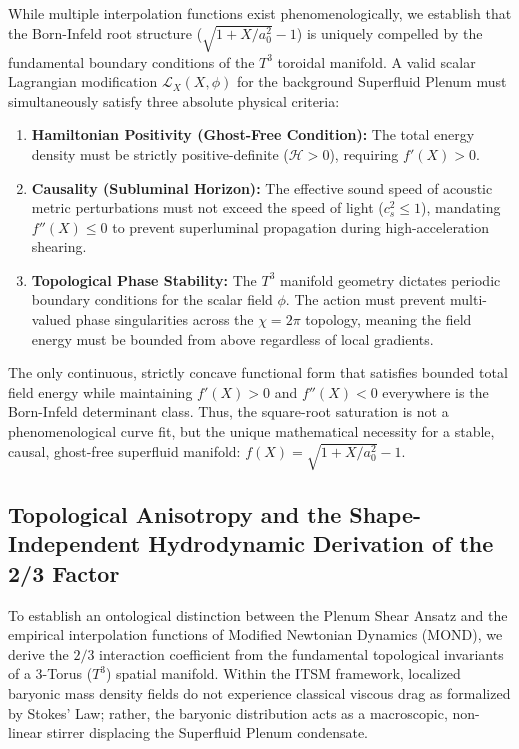 \documentclass[aps,prd,10pt,twocolumn,superscriptaddress,nofootinbib]{revtex4-2}
\begin{document}
While multiple interpolation functions exist phenomenologically, we establish that the Born-Infeld root structure ($\sqrt{1+X/a_0^2}-1$) is uniquely compelled by the fundamental boundary conditions of the $T^3$ toroidal manifold. A valid scalar Lagrangian modification $\mathcal{L}_X(X, \phi)$ for the background Superfluid Plenum must simultaneously satisfy three absolute physical criteria:
\begin{enumerate}
    \item \textbf{Hamiltonian Positivity (Ghost-Free Condition):} The total energy density must be strictly positive-definite ($\mathcal{H} > 0$), requiring $f'(X) > 0$.
    \item \textbf{Causality (Subluminal Horizon):} The effective sound speed of acoustic metric perturbations must not exceed the speed of light ($c_s^2 \le 1$), mandating $f''(X) \le 0$ to prevent superluminal propagation during high-acceleration shearing.
    \item \textbf{Topological Phase Stability:} The $T^3$ manifold geometry dictates periodic boundary conditions for the scalar field $\phi$. The action must prevent multi-valued phase singularities across the $\chi=2\pi$ topology, meaning the field energy must be bounded from above regardless of local gradients.
\end{enumerate}
The only continuous, strictly concave functional form that satisfies bounded total field energy while maintaining $f'(X)>0$ and $f''(X)<0$ everywhere is the Born-Infeld determinant class. Thus, the square-root saturation is not a phenomenological curve fit, but the unique mathematical necessity for a stable, causal, ghost-free superfluid manifold: $f(X) = \sqrt{1+X/a_0^2}-1$.

\subsection{\label{sec:projection}Topological Anisotropy and the Shape-Independent Hydrodynamic Derivation of the 2/3 Factor}

To establish an ontological distinction between the Plenum Shear Ansatz and the empirical interpolation functions of Modified Newtonian Dynamics (MOND), we derive the $2/3$ interaction coefficient from the fundamental topological invariants of a 3-Torus ($T^3$) spatial manifold. Within the ITSM framework, localized baryonic mass density fields do not experience classical viscous drag as formalized by Stokes' Law; rather, the baryonic distribution acts as a macroscopic, non-linear stirrer displacing the Superfluid Plenum condensate.
\end{document}
